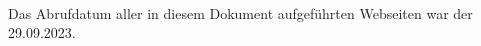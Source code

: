 \Hinweise

\paragraph*{}

Das Abrufdatum aller in diesem Dokument aufgeführten Webseiten war der 29.09.2023.